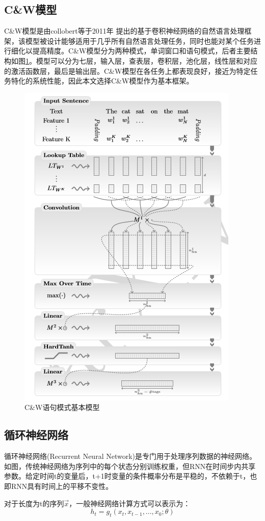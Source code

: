 \subsection{C\&W模型}
C\&W模型是由collobert等于2011年\cite{collobert2011} 提出的基于卷积神经网络的自然语言处理框架，该模型被设计能够适用于几乎所有自然语言处理任务，同时也能对某个任务进行细化以提高精度。C\&W模型分为两种模式，单词窗口和语句模式，后者主要结构如图\ref{candw1}。模型可以分为七层，输入层，查表层，卷积层，池化层，线性层和对应的激活函数层，最后是输出层。C\&W模型在各任务上都表现良好，接近为特定任务特化的系统性能，因此本文选择C\&W模型作为基本框架。
\begin{figure}
\begin{center}
\includegraphics{graphic/candw1.png}
\caption{C\&W语句模式基本模型 \label{candw1}}
\end{center}
\end{figure}
\subsection{循环神经网络}
循环神经网络(Recurrent Neural Network)是专门用于处理序列数据的神经网络。如图，传统神经网络为序列中的每个状态分别训练权重，但RNN在时间步内共享参数。给定时间t的变量后，t+1时变量的条件概率分布是平稳的，不依赖于t，也即RNN具有时间上的平移不变性。\par
对于长度为{t}的序列$\vec{x}$，一般神经网络计算方式可以表示为：
\begin{equation}
h_t = g_t(x_t, x_{t-1},...,x_0;\theta)
\end{equation}


